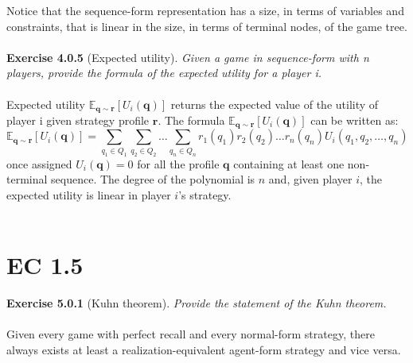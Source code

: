 \noindent
Notice that the sequence-form representation has a size, in terms of variables and constraints, that is linear in the size, in terms of terminal nodes, of the game tree.\\\\
\textbf{Exercise 4.0.5} (Expected utility). \textit{Given a game in sequence-form with n players, provide the formula of the
expected utility for a player i.}\\\\
Expected utility $\mathbb{E}_{\mathbf{q} \sim \mathbf{r}}\left[U_{i}(\mathbf{q})\right]$ returns the expected value of the utility of player i given strategy profile $\mathbf{r}$. The formula $\mathbb{E}_{\mathbf{q} \sim \mathbf{r}}\left[U_{i}(\mathbf{q})\right]$ can be written as:
$$
\mathbb{E}_{\mathbf{q} \sim \mathbf{r}}\left[U_{i}(\mathbf{q})\right]=\sum_{q_{1} \in Q_{1}} \sum_{q_{2} \in Q_{2}} \ldots \sum_{q_{n} \in Q_{n}} r_{1}\left(q_{1}\right) r_{2}\left(q_{2}\right) \ldots r_{n}\left(q_{n}\right) U_{i}\left(q_{1}, q_{2}, \ldots, q_{n}\right)
$$
once assigned $U_{i}(\mathbf{q})=0$ for all the profile $\mathbf{q}$ containing at least one non-terminal sequence. The degree of the polynomial is $n$ and, given player $i$, the expected utility is linear in player $i$'s strategy.\\\\

\section{EC 1.5}
\textbf{Exercise 5.0.1} (Kuhn theorem). \textit{Provide the statement of the Kuhn theorem.}\\\\
Given every game with perfect recall and every normal-form strategy, there always exists at least a realization-equivalent agent-form strategy and vice versa.\\\\

